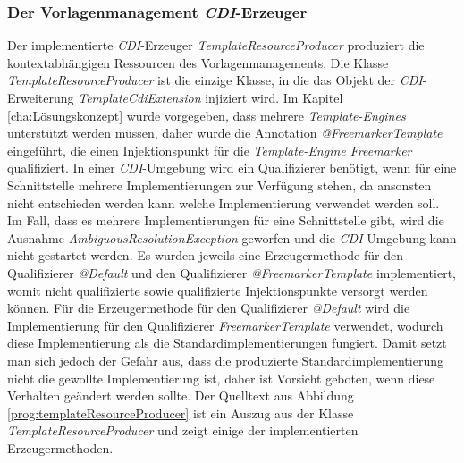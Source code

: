 \subsubsection{Der Vorlagenmanagement \emph{CDI}-Erzeuger}
Der implementierte \emph{CDI}-Erzeuger \emph{TemplateResourceProducer} produziert die kontextabhängigen Ressourcen des Vorlagenmanagements. Die Klasse \emph{TemplateResourceProducer} ist die einzige Klasse, in die das Objekt der \emph{CDI}-Erweiterung \emph{TemplateCdiExtension} injiziert wird. Im Kapitel \ref{cha:Lösungskonzept} wurde vorgegeben, dass mehrere \emph{Template-Engines} unterstützt werden müssen, daher wurde die Annotation \emph{@FreemarkerTemplate} eingeführt, die einen Injektionspunkt für die \emph{Template-Engine Freemarker} qualifiziert. In einer \emph{CDI}-Umgebung wird ein Qualifizierer benötigt, wenn für eine Schnittstelle mehrere Implementierungen zur Verfügung stehen, da ansonsten nicht entschieden werden kann welche Implementierung verwendet werden soll. Im Fall, dass es mehrere Implementierungen für eine Schnittstelle gibt, wird die Ausnahme \emph{AmbiguousResolutionException} geworfen und die \emph{CDI}-Umgebung kann nicht gestartet werden. 
\newline
\newline
Es wurden jeweils eine Erzeugermethode für den Qualifizierer \emph{@Default} und den Qualifizierer \emph{@FreemarkerTemplate} implementiert, womit nicht qualifizierte sowie qualifizierte Injektionspunkte versorgt werden können. Für die Erzeugermethode für den Qualifizierer \emph{@Default} wird die Implementierung für den Qualifizierer \emph{FreemarkerTemplate} verwendet, wodurch diese Implementierung als die Standardimplementierungen fungiert. Damit setzt man sich jedoch der Gefahr aus, dass die produzierte Standardimplementierung nicht die gewollte Implementierung ist, daher ist Vorsicht geboten, wenn diese Verhalten geändert werden sollte. 
\newline
\newline
Der Quelltext aus Abbildung \ref{prog:templateResourceProducer} ist ein Auszug aus der Klasse \emph{TemplateResourceProducer} und zeigt einige der implementierten Erzeugermethoden. 
